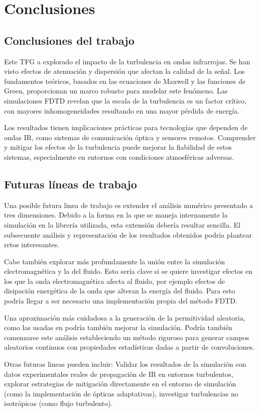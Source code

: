 \section{Conclusiones}
\subsection{Conclusiones del trabajo}

Este TFG a explorado el impacto de la turbulencia en ondas infrarrojas. Se han visto efectos de atenuación y dispersión que afectan la calidad de la señal. Los fundamentos teóricos, basados en las ecuaciones de Maxwell y las funciones de Green, proporcionan un marco robusto para modelar este fenómeno. Las simulaciones FDTD revelan que la escala de la turbulencia es un factor crítico, con mayores inhomogeneidades resultando en una mayor pérdida de energía.

Los resultados tienen implicaciones prácticas para tecnologías que dependen de ondas IR, como sistemas de comunicación óptica y sensores remotos. Comprender y mitigar los efectos de la turbulencia puede mejorar la fiabilidad de estos sistemas, especialmente en entornos con condiciones atmosféricas adversas. 

\subsection{Futuras líneas de trabajo}

Una posible futura linea de trabajo es extender el análisis numérico presentado a tres dimensiones. Debido a la forma en la que se maneja internamente la simulación en la librería utilizada, esta extensión debería resultar sencilla. El subsecuente análisis y representación de los resultados obtenidos podría plantear retos interesantes. 

Cabe también explorar más profundamente la unión entre la simulación electromagnética y la del fluido. Esto sería clave si se quiere investigar efectos en los que la onda electromagnética afecta al fluido, por ejemplo efectos de disipación energética de la onda que alteran la energía del fluido. Para esto podría llegar a ser necesario una implementación propia del método FDTD.

Una aproximación más cuidadosa a la generación de la permitividad aleatoria, como las usadas en \cite{moss_finite-difference_2002} podría también mejorar la simulación. Podría también comenzarse este análisis estableciendo un método riguroso para generar campos aleatorios continuos con propiedades estadísticas dadas a partir de convoluciones. 

Otras futuras lineas pueden incluir: Validar los resultados de la simulación con datos experimentales reales de propagación de IR en entornos turbulentos, explorar estrategias de mitigación directamente en el entorno de simulación (como la implementación de ópticas adaptativas), investigar turbulencias no isotrópicas (como flujo turbulento).